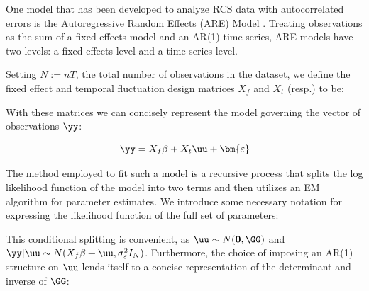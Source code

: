 
One model that has been developed to analyze RCS data with autocorrelated errors is the Autoregressive Random Effects (ARE) Model \citep{modugno2015multilevel}. Treating observations as the sum of a fixed effects model and an AR(1) time series, ARE models have two levels: a fixed-effects level and a time series level.



Setting $N:=nT$, the total number of observations in the dataset,  we define the fixed effect and temporal fluctuation design matrices $X_f$ and $X_t$ (resp.) to be:


With these matrices we can concisely represent the model governing the vector of observations $\yy$:

$$ \yy = X_f\beta + X_t\uu + \bm{\varepsilon}$$

The method employed to fit such a model is a recursive process that splits the log likelihood function of the model into two terms and then utilizes an EM algorithm for parameter estimates. We introduce some necessary notation for expressing the likelihood function of the full set of parameters:







This conditional splitting is convenient, as $\uu \sim N(\mathbf{0},\GG)$ and $\yy|\uu \sim N(X_f\beta + \uu, \sigma_\varepsilon^2I_N)$. Furthermore, the choice of imposing an AR(1) structure on $\uu$ lends itself to a concise representation of the determinant and inverse of $\GG$:



